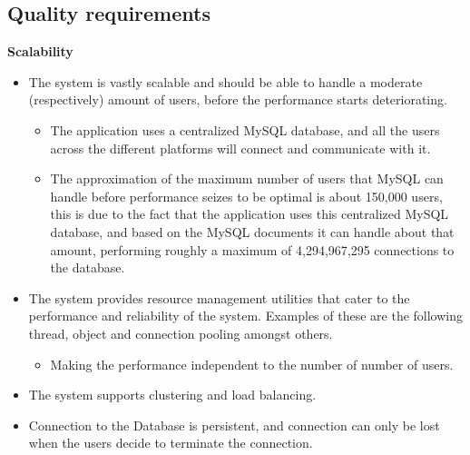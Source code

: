 \documentclass[10pt,a4paper]{article}
\begin{document}
\subsection{Quality requirements}
\begin{center}\textbf{Scalability}\end{center}
                               \begin{itemize}
                                                \item The system is vastly scalable and should be able to handle a moderate (respectively) amount of users, before the performance starts deteriorating.
                                                \begin{itemize}
                                                                \item The application uses a centralized MySQL database, and all the users across the different platforms will connect and communicate with it. 
                                                                \item The approximation of the maximum number of users that MySQL can handle before performance seizes to be optimal is about 150,000 users, this is due to the fact that the application uses this centralized MySQL database, and based on the MySQL documents it can handle about that amount, performing roughly a maximum of 4,294,967,295 connections to the database. 
                                                \end{itemize}
                                \end{itemize}
                \begin{itemize}
                        \item The system provides resource management utilities that cater to the performance and reliability of the system. Examples of these are the following thread, object and connection pooling amongst others.
                        \begin{itemize}
                                \item Making the performance independent to the number of number of users.
                        \end{itemize}
                \end{itemize}
                \begin{itemize}
                        \item The system supports clustering and load balancing.
                \end{itemize}
                \begin{itemize}
                        \item Connection to the Database is persistent, and connection can only be lost when the users decide to terminate the connection.\\
                \end{itemize}
\end{document}
